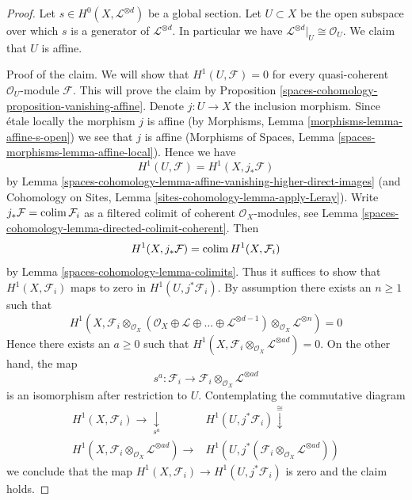 \begin{proof}
Let $s \in H^0(X, \mathcal{L}^{\otimes d})$ be a global section.
Let $U \subset X$ be the open subspace over which $s$ is a generator
of $\mathcal{L}^{\otimes d}$. In particular we have
$\mathcal{L}^{\otimes d}|_U \cong \mathcal{O}_U$.
We claim that $U$ is affine.

\medskip\noindent
Proof of the claim. We will show that $H^1(U, \mathcal{F}) = 0$
for every quasi-coherent $\mathcal{O}_U$-module $\mathcal{F}$.
This will prove the claim by Proposition \ref{spaces-cohomology-proposition-vanishing-affine}.
Denote $j : U \to X$ the inclusion morphism.
Since \'etale locally the morphism $j$ is affine
(by Morphisms, Lemma \ref{morphisms-lemma-affine-s-open})
we see that $j$ is affine (Morphisms of Spaces, Lemma
\ref{spaces-morphisms-lemma-affine-local}).
Hence we have
$$
H^1(U, \mathcal{F}) = H^1(X, j_*\mathcal{F})
$$
by Lemma \ref{spaces-cohomology-lemma-affine-vanishing-higher-direct-images}
(and Cohomology on Sites, Lemma \ref{sites-cohomology-lemma-apply-Leray}).
Write $j_*\mathcal{F} = \operatorname{colim} \mathcal{F}_i$ as a filtered colimit
of coherent $\mathcal{O}_X$-modules, see
Lemma \ref{spaces-cohomology-lemma-directed-colimit-coherent}. Then
$$
H^1(X, j_*\mathcal{F}) = \operatorname{colim} H^1(X, \mathcal{F}_i)
$$
by Lemma \ref{spaces-cohomology-lemma-colimits}.
Thus it suffices to show that $H^1(X, \mathcal{F}_i)$ maps
to zero in $H^1(U, j^*\mathcal{F}_i)$. By assumption there exists
an $n \geq 1$ such that
$$
H^1(X,
\mathcal{F}_i \otimes_{\mathcal{O}_X}
(\mathcal{O}_X \oplus \mathcal{L} \oplus \ldots
\oplus \mathcal{L}^{\otimes d - 1})
\otimes_{\mathcal{O}_X} \mathcal{L}^{\otimes n}) = 0
$$
Hence there exists an $a \geq 0$ such that
$H^1(X, \mathcal{F}_i \otimes_{\mathcal{O}_X} \mathcal{L}^{\otimes ad}) = 0$.
On the other hand, the map
$$
s^a : \mathcal{F}_i \longrightarrow
\mathcal{F}_i \otimes_{\mathcal{O}_X} \mathcal{L}^{\otimes ad}
$$
is an isomorphism after restriction to $U$. Contemplating the
commutative diagram
$$
\begin{array}{cc}H^1(X, \mathcal{F}_i) \longrightarrow\underset{s^a}{\downarrow} & H^1(U, j^*\mathcal{F}_i)
\overset{\cong}{\downarrow} \\ H^1(X, \mathcal{F}_i \otimes_{\mathcal{O}_X} \mathcal{L}^{\otimes ad}) \longrightarrow & H^1(U,
j^*(\mathcal{F}_i \otimes_{\mathcal{O}_X} \mathcal{L}^{\otimes ad}))\end{array}
$$
we conclude that the map  $H^1(X, \mathcal{F}_i) \to H^1(U, j^*\mathcal{F}_i)$
is zero and the claim holds.


\end{proof}
